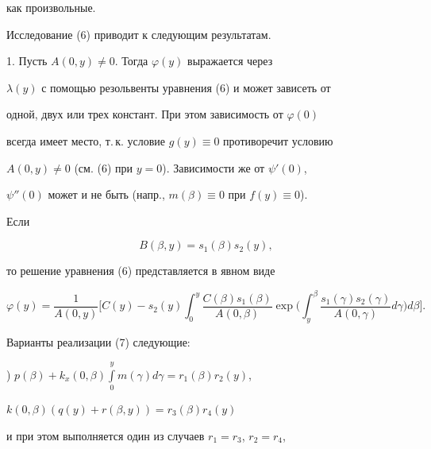 как произвольные.





Исследование (6) приводит к следующим результатам.


\medskip





1. Пусть $A(0,y)\ne0$. Тогда $\varphi(y)$ выражается через


$\lambda(y)$ с помощью резольвенты уравнения (6) и может зависеть от


одной, двух или трех констант. При этом зависимость от $\varphi(0)$


всегда имеет место, т.\,к. условие $g(y)\equiv 0$ противоречит условию


$A(0,y)\ne0$ (см. (6) при $y=0$). Зависимости же от $\psi'(0)$,


$\psi''(0)$ может и не быть (напр., $m(\beta)\equiv0$ при $f(y)\equiv0$).





Если


\begin{equation}


B(\beta,y)=s_{1}(\beta)s_{2}(y),


\end{equation}


то решение уравнения (6) представляется в явном виде


$$


\varphi(y) = \frac{1}{A(0,y)}\bigg[C(y) - s_{2}(y)\int_{0}^{y}


\frac{C(\beta)s_{1}(\beta)}{A(0,\beta)}\exp \bigg (\int_{y}^{\beta}


\frac{s_{1}(\gamma)s_{2}(\gamma)}{A(0,\gamma)} d\gamma \bigg)


d\beta\bigg].


$$








Варианты реализации (7) следующие:





) $p(\beta)+k_{x}(0,\beta)\int \limits_{0}^{y}m(\gamma)d\gamma =


r_{1}(\beta)r_{2}(y)$, 


$k(0,\beta)(q(y)+r(\beta,y))=r_{3}(\beta)r_{4}(y)$


и при этом выполняется один из случаев $r_{1}=r_{3}$, $r_{2}=r_{4}$,


